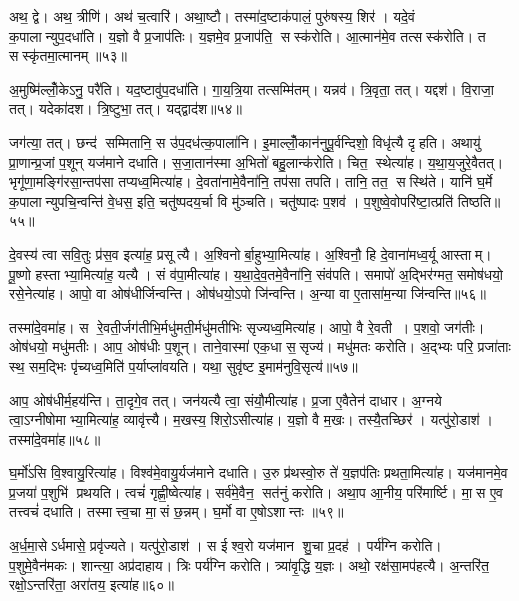अथ॒ द्वे।
अथ॒ त्रीणि॑।
अथ॑ च॒त्वारि॑।
अथा॒ष्टौ।
तस्मा॑द॒ष्टाक॑पालं॒ पुरु॑षस्य॒ शिर॑।
यदे॒वं क॒पालान्युप॒दधा॑ति।
य॒ज्ञो वै प्र॒जाप॑तिः।
य॒ज्ञमे॒व प्र॒जाप॑ति॒ सस्क॑रोति।
आ॒त्मान॑मे॒व तत्सस्क॑रोति।
त सस्कृ॑तमा॒त्मानम्॥५३॥

अ॒मुष्मि॑ल्लोँ॒केऽनु॒ परै॑ति।
यद॒ष्टावु॑प॒दधा॑ति।
गा॒य॒त्रि॒या तत्सम्मि॑तम्।
यन्नव॑।
त्रि॒वृता॒ तत्।
यद्दश॑।
वि॒राजा॒ तत्।
यदेका॑दश।
त्रि॒ष्टुभा॒ तत्।
यद्द्वाद॑श॥५४॥

जग॑त्या॒ तत्।
छन्द॑ सम्मितानि॒ स उ॑प॒दध॑त्क॒पाला॑नि।
इ॒माल्लोँ॒कान॑नुपू॒र्वन्दिशो॒ विधृ॑त्यै दृहति।
अथायु॑ प्रा॒णान्प्र॒जां प॒शून् यज॑माने दधाति।
स॒जा॒तान॑स्मा अ॒भितो॑ बहु॒लान्क॑रोति।
चित॒ स्थेत्या॑ह।
य॒था॒य॒जुरे॒वैतत्।
भृगू॑णा॒मङ्गि॑रसा॒न्तप॑सा तप्यध्व॒मित्या॑ह।
दे॒वता॑नामे॒वैना॑नि॒ तप॑सा तपति।
तानि॒ तत॒ सस्थि॑ते।
यानि॑ घ॒र्मे क॒पालान्युपचि॒न्वन्ति॑ वे॒धस॒ इति॒ चतु॑ष्पदय॒र्चा वि मु॑ञ्चति।
चतु॑ष्पादः प॒शव॑।
प॒शुष्वे॒वोपरि॑ष्टा॒त्प्रति॑ तिष्ठति॥५५॥\anuvakamend[व॒र्त॒य॒ति॒ दिव॑मे॒वैतेन॑ दृहति स॒म्भव॑ति॒ त सस्कृ॑तमा॒त्मानं॒ द्वाद॑श॒ सस्थि॑ते॒ त्रीणि॑ च]

दे॒वस्य॑ त्वा सवि॒तुः प्र॑स॒व इत्या॑ह॒ प्रसूत्यै।
अ॒श्विनोर्बा॒हुभ्या॒मित्या॑ह।
अ॒श्विनौ॒ हि दे॒वाना॑मध्व॒र्यू आस्ताम्।
पू॒ष्णो हस्ताभ्या॒मित्या॑ह॒ यत्यै।
सं व॑पा॒मीत्या॑ह।
य॒था॒दे॒व॒तमे॒वैना॑नि॒ संव॑पति।
समापो॑ अ॒द्भिर॑ग्मत॒ समोष॑धयो॒ रसे॒नेत्या॑ह।
आपो॒ वा ओष॑धीर्जिन्वन्ति।
ओष॑धयो॒ऽपो जि॑न्वन्ति।
अ॒न्या वा ए॒तासा॑म॒न्या जि॑न्वन्ति॥५६॥

तस्मा॑दे॒वमा॑ह।
स रे॒वती॒र्जग॑तीभि॒र्मधु॑मती॒र्मधु॑मतीभिः सृज्यध्व॒मित्या॑ह।
आपो॒ वै रे॒वती।
प॒शवो॒ जग॑तीः।
ओष॑धयो॒ मधु॑मतीः।
आप॒ ओष॑धीः प॒शून्।
ताने॒वास्मा॑ एक॒धा स॒सृज्य॑।
मधु॑मतः करोति।
अ॒द्भ्यः परि॒ प्रजा॑ताः स्थ॒ सम॒द्भिः पृ॑च्यध्व॒मिति॑ प॒र्याप्ला॑वयति।
यथा॒ सुवृ॑ष्ट इ॒माम॑नुवि॒सृत्य॑॥५७॥

आप॒ ओष॑धीर्म॒हय॑न्ति।
ता॒दृगे॒व तत्।
जन॑यत्यै त्वा॒ संयौ॒मीत्या॑ह।
प्र॒जा ए॒वैतेन॑ दाधार।
अ॒ग्नये त्वा॒ऽग्नीषोमाभ्या॒मित्या॑ह॒ व्यावृ॑त्त्यै।
म॒खस्य॒ शिरो॒ऽसीत्या॑ह।
य॒ज्ञो वै म॒खः।
तस्यै॒तच्छिर॑।
यत्पु॑रो॒डाश॑।
तस्मा॑दे॒वमा॑ह॥५८॥

घ॒र्मो॑ऽसि वि॒श्वायु॒रित्या॑ह।
विश्व॑मे॒वायु॒र्यज॑माने दधाति।
उ॒रु प्र॑थस्वो॒रु ते॑ य॒ज्ञप॑तिः प्रथता॒मित्या॑ह।
यज॑मानमे॒व प्र॒जया॑ प॒शुभि॑ प्रथयति।
त्वचं॑ गृह्णी॒ष्वेत्या॑ह।
सर्व॑मे॒वैन॒ सत॑नुं करोति।
अथा॒प आ॒नीय॒ परि॑मार्ष्टि।
मा॒स ए॒व तत्त्वचं॑ दधाति।
तस्मात्त्व॒चा मा॒सं छ॒न्नम्।
घ॒र्मो वा ए॒षोऽशान्तः ॥५९॥

अ॒र्ध॒मा॒सेऽर्धमासे॒ प्रवृ॑ज्यते।
यत्पु॑रो॒डाश॑।
स ईश्व॒रो यज॑मान शु॒चा प्र॒दह॑।
पर्य॑ग्नि करोति।
प॒शुमे॒वैन॑मकः।
शान्त्या॒ अप्र॑दाहाय।
त्रिः पर्य॑ग्नि करोति।
त्र्या॑वृ॒द्धि य॒ज्ञः।
अथो॒ रक्ष॑सा॒मप॑हत्यै।
अ॒न्तरि॑त॒ रक्षो॒ऽन्तरि॑ता॒ अरा॑तय॒ इत्या॑ह॥६०॥

